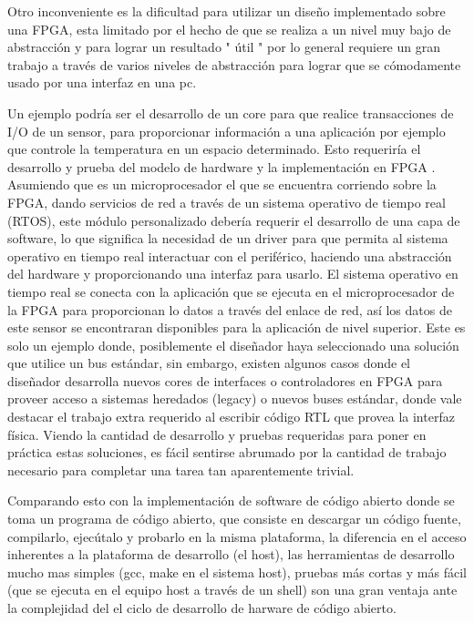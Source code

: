 Otro inconveniente es la dificultad para utilizar un diseño implementado sobre una FPGA, esta limitado por el hecho de que se realiza a un nivel muy bajo de abstracción y para lograr un resultado " útil " por lo general requiere un gran trabajo a través de varios niveles de abstracción para lograr que se cómodamente usado por una interfaz en una pc.

Un ejemplo podría ser el desarrollo de un core para que realice transacciones de I/O de un sensor, para proporcionar información a una aplicación por ejemplo que controle la temperatura en un espacio determinado. Esto requeriría el desarrollo y prueba del modelo de hardware y la implementación en FPGA . Asumiendo que es un microprocesador el que se encuentra corriendo sobre la FPGA, dando servicios de red a través de un sistema operativo de tiempo real (RTOS), este módulo personalizado debería requerir el desarrollo de una capa de software, lo que significa la necesidad de un driver para que permita al sistema operativo en tiempo real interactuar con el periférico, haciendo una abstracción del hardware y proporcionando una interfaz para usarlo. El sistema operativo en tiempo real se conecta con la aplicación que se ejecuta en el microprocesador de la FPGA para proporcionan lo datos a través del enlace de red, así los datos de este sensor se encontraran disponibles para la aplicación de nivel superior. Este es solo un ejemplo donde, posiblemente el diseñador haya seleccionado una solución que utilice un bus estándar, sin embargo, existen algunos casos donde el diseñador desarrolla nuevos cores de interfaces o controladores en FPGA para proveer acceso a sistemas heredados (legacy) o nuevos buses estándar, donde vale destacar el trabajo extra requerido al escribir código RTL que provea la interfaz física.
Viendo la cantidad de desarrollo y pruebas requeridas para poner en práctica estas soluciones, es fácil sentirse abrumado por la cantidad de trabajo necesario para completar una tarea tan aparentemente trivial.

Comparando esto con la implementación de software de código abierto donde se toma un programa de código abierto, que consiste en descargar un código fuente, compilarlo, ejecútalo y probarlo en la misma plataforma, la diferencia en el acceso inherentes a la plataforma de desarrollo (el host), las herramientas de desarrollo mucho mas simples (gcc, make en el sistema host), pruebas más cortas y más fácil (que se ejecuta en el equipo host a través de un shell) son una gran ventaja ante la complejidad del el ciclo de desarrollo de harware de código abierto.


